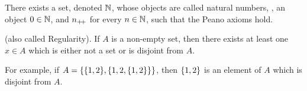 \begin{axiom}[Infinity] \label{def:zfc:infinity}
    There exists a set, denoted $\mathbb{N}$, whose objects are called natural numbers,
    \ie, an object $0 \in \mathbb{N}$, and $n_{+\!+}$ for every $n \in \mathbb{N}$, such that the
    Peano axioms hold.
\end{axiom}

\begin{axiom}[Foundation] \label{def:zfc:foundation}
    (also called Regularity).
    If $A$ is a non-empty set, then there exists at least one $x \in A$ which
    is either not a set or is disjoint from $A$.
\end{axiom}
For example, if $A = \set{\set{1, 2}, \set{1, 2, \set{1, 2}}}$, then
$\set{1, 2}$ is an element of $A$ which is disjoint from $A$.
